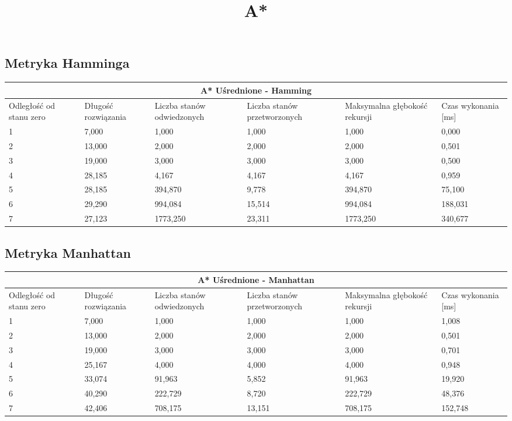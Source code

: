\documentclass{classrep}
\begin{document}
{\begin{center}
	\title{\textbf{A*}}
\end{center}

\subsection{Metryka Hamminga}
\begin{center}
	\begin{tabular}{ | p{1.6cm} | p{1.4cm} | p{1.8cm} | p{2cm} | p{2.2cm} | p{2cm} | }
	\hline
	\multicolumn{6}{|c|}{A* Uśrednione - Hamming} \\
	\hline
	Odległość od stanu zero & Długość rozwiązania & Liczba stanów odwiedzonych & Liczba stanów przetworzonych & Maksymalna głębokość rekursji & Czas wykonania [ms]\\
	\hline
	1&7,000&1,000&1,000&1,000&0,000 \\
	\hline
	2&13,000&2,000&2,000&2,000&0,501\\
	\hline
	3 &19,000&3,000&3,000&3,000&0,500\\
	\hline
	4 &28,185&4,167&4,167&4,167&0,959\\
	\hline
	5 &28,185&394,870&9,778&394,870&75,100\\
	\hline
	6&29,290&994,084&15,514&994,084&188,031\\
	\hline
	7 &27,123&1773,250&23,311&1773,250&340,677\\
	\hline
	\end{tabular}
\end{center}

\subsection{Metryka Manhattan}
\begin{center}
	\begin{tabular}{ | p{1.6cm} | p{1.4cm} | p{1.8cm} | p{2cm} | p{2.2cm} | p{2cm} | }
	\hline
	\multicolumn{6}{|c|}{A* Uśrednione - Manhattan} \\
	\hline
	Odległość od stanu zero & Długość rozwiązania & Liczba stanów odwiedzonych & Liczba stanów przetworzonych & Maksymalna głębokość rekursji & Czas wykonania [ms]\\
	\hline
	1&7,000&1,000&1,000&1,000&1,008 \\
	\hline
	2&13,000&2,000&2,000&2,000&0,501\\
	\hline
	3 &19,000&3,000&3,000&3,000&0,701\\
	\hline
	4& 25,167&4,000&4,000&4,000&0,948\\
	\hline
	5& 33,074&91,963&5,852&91,963&19,920\\
	\hline
	6& 40,290&222,729&8,720&222,729&48,376\\
	\hline
	7& 42,406&708,175&13,151&708,175&152,748\\	
	\hline
	\end{tabular}
\end{center}
}
\end{document}

